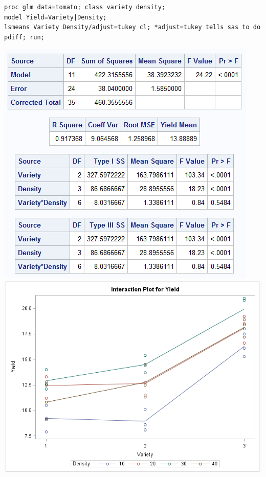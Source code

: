 \begin{small}
\begin{verbatim}
proc glm data=tomato; class variety density;
model Yield=Variety|Density;
lsmeans Variety Density/adjust=tukey cl; *adjust=tukey tells sas to do pdiff; run;
\end{verbatim}
\end{small}
\begin{center}
\includegraphics[scale=0.65]{Tomato1}\includegraphics[scale=0.5]{Tomato2}
\end{center}

